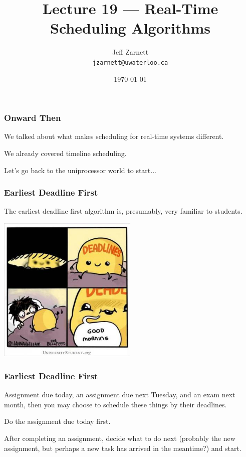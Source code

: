 

\title{Lecture 19 --- Real-Time Scheduling Algorithms }

\author{Jeff Zarnett \\ \small \texttt{jzarnett@uwaterloo.ca}}
\date{\today}




\begin{frame}
  \titlepage

 \end{frame}


\begin{frame}
\frametitle{Onward Then}

We talked about what makes scheduling for real-time systems different.

We already covered timeline scheduling.

Let's go back to the uniprocessor world to start...

\end{frame}


\begin{frame}
\frametitle{Earliest Deadline First}

The earliest deadline first algorithm is, presumably, very familiar to students. 

\begin{center}
	\includegraphics[width=0.5\textwidth]{images/deadlines.jpg}
\end{center}

\end{frame}


\begin{frame}
\frametitle{Earliest Deadline First}

Assignment due today, an assignment due next Tuesday, and an exam next month, then you may choose to schedule these things by their deadlines. 

Do the assignment due today first. 

After completing an assignment, decide what to do next (probably the new assignment, but perhaps a new task has arrived in the meantime?) and start.


\end{frame}

